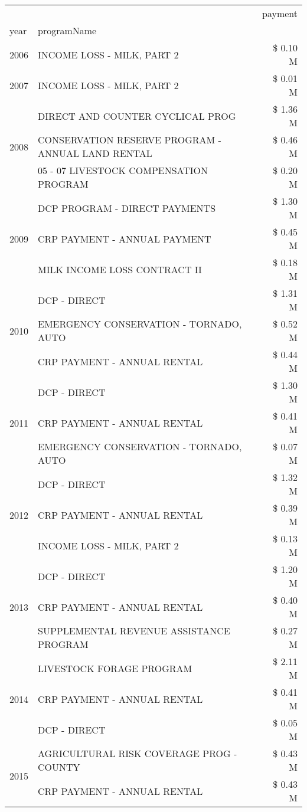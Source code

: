 \begin{tabular}{llr}
\toprule
 &  & payment \\
year & programName &  \\
\midrule
2006 & INCOME LOSS - MILK, PART 2 & \$ 0.10 M \\
\cline{1-3}
2007 & INCOME LOSS - MILK, PART 2 & \$ 0.01 M \\
\cline{1-3}
\multirow[t]{3}{*}{2008} & DIRECT AND COUNTER CYCLICAL PROG & \$ 1.36 M \\
 & CONSERVATION RESERVE PROGRAM - ANNUAL LAND RENTAL & \$ 0.46 M \\
 & 05 - 07 LIVESTOCK COMPENSATION PROGRAM & \$ 0.20 M \\
\cline{1-3}
\multirow[t]{3}{*}{2009} & DCP PROGRAM - DIRECT PAYMENTS & \$ 1.30 M \\
 & CRP PAYMENT - ANNUAL PAYMENT & \$ 0.45 M \\
 & MILK INCOME LOSS CONTRACT II & \$ 0.18 M \\
\cline{1-3}
\multirow[t]{3}{*}{2010} & DCP - DIRECT & \$ 1.31 M \\
 & EMERGENCY CONSERVATION - TORNADO, AUTO & \$ 0.52 M \\
 & CRP PAYMENT - ANNUAL RENTAL & \$ 0.44 M \\
\cline{1-3}
\multirow[t]{3}{*}{2011} & DCP - DIRECT & \$ 1.30 M \\
 & CRP PAYMENT - ANNUAL RENTAL & \$ 0.41 M \\
 & EMERGENCY CONSERVATION - TORNADO, AUTO & \$ 0.07 M \\
\cline{1-3}
\multirow[t]{3}{*}{2012} & DCP - DIRECT & \$ 1.32 M \\
 & CRP PAYMENT - ANNUAL RENTAL & \$ 0.39 M \\
 & INCOME LOSS - MILK, PART 2 & \$ 0.13 M \\
\cline{1-3}
\multirow[t]{3}{*}{2013} & DCP - DIRECT & \$ 1.20 M \\
 & CRP PAYMENT - ANNUAL RENTAL & \$ 0.40 M \\
 & SUPPLEMENTAL REVENUE ASSISTANCE PROGRAM & \$ 0.27 M \\
\cline{1-3}
\multirow[t]{3}{*}{2014} & LIVESTOCK FORAGE PROGRAM & \$ 2.11 M \\
 & CRP PAYMENT - ANNUAL RENTAL & \$ 0.41 M \\
 & DCP - DIRECT & \$ 0.05 M \\
\cline{1-3}
\multirow[t]{3}{*}{2015} & AGRICULTURAL RISK COVERAGE PROG - COUNTY & \$ 0.43 M \\
 & CRP PAYMENT - ANNUAL RENTAL & \$ 0.43 M \\

\end{tabular}
